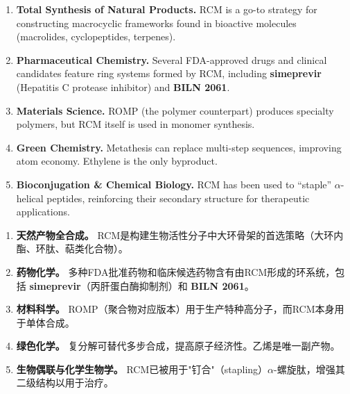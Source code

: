 \documentclass[11pt, a4paper]{article}
\begin{document}
\begin{enbox}[English]
\begin{enumerate}[label=\textbf{\arabic*.}]
  \item \textbf{Total Synthesis of Natural Products.} RCM is a go-to strategy for constructing macrocyclic frameworks found in bioactive molecules (macrolides, cyclopeptides, terpenes).

  \item \textbf{Pharmaceutical Chemistry.} Several FDA-approved drugs and clinical candidates feature ring systems formed by RCM, including \textbf{simeprevir} (Hepatitis C protease inhibitor) and \textbf{BILN 2061}.

  \item \textbf{Materials Science.}  ROMP (the polymer counterpart) produces specialty polymers, but RCM itself is used in monomer synthesis.

  \item \textbf{Green Chemistry.}  Metathesis can replace multi-step sequences, improving atom economy.  Ethylene is the only byproduct.

  \item \textbf{Bioconjugation \& Chemical Biology.}  RCM has been used to ``staple'' $\alpha$-helical peptides, reinforcing their secondary structure for therapeutic applications.
\end{enumerate}
\end{enbox}

\begin{cnbox}[中文]
\begin{enumerate}[label=\textbf{\arabic*.}]
  \item \textbf{天然产物全合成。} RCM是构建生物活性分子中大环骨架的首选策略（大环内酯、环肽、萜类化合物）。

  \item \textbf{药物化学。} 多种FDA批准药物和临床候选药物含有由RCM形成的环系统，包括 \textbf{simeprevir}（丙肝蛋白酶抑制剂）和 \textbf{BILN 2061}。

  \item \textbf{材料科学。} ROMP（聚合物对应版本）用于生产特种高分子，而RCM本身用于单体合成。

  \item \textbf{绿色化学。} 复分解可替代多步合成，提高原子经济性。乙烯是唯一副产物。

  \item \textbf{生物偶联与化学生物学。} RCM已被用于"钉合"（stapling）$\alpha$-螺旋肽，增强其二级结构以用于治疗。
\end{enumerate}
\end{cnbox}
\end{document}
